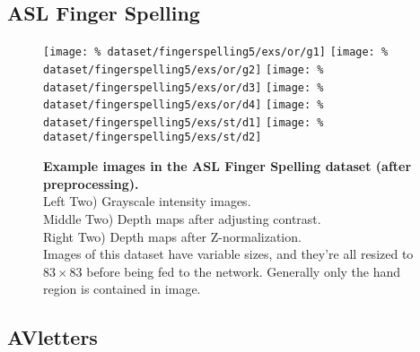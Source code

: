 \subsection{ASL Finger Spelling}

\begin{figure}[H]
  \centering
  \hfill
  \texttt{[image: \%
    dataset/fingerspelling5/exs/or/g1]}
  \hfill
  \texttt{[image: \%
    dataset/fingerspelling5/exs/or/g2]}
  \hfill
  \texttt{[image: \%
    dataset/fingerspelling5/exs/or/d3]}
  \hfill
  \texttt{[image: \%
    dataset/fingerspelling5/exs/or/d4]}
  \hfill
  \texttt{[image: \%
    dataset/fingerspelling5/exs/st/d1]}
  \hfill
  \texttt{[image: \%
    dataset/fingerspelling5/exs/st/d2]}
  \caption{%
    \textbf{Example images in the ASL Finger Spelling dataset
      (after preprocessing).}\\[0.1em]
    Left Two) Grayscale intensity images.\\[0.1em]
    Middle Two) Depth maps after adjusting contrast.\\[0.1em]
    Right Two) Depth maps after Z-normalization.\\[0.1em]
    Images of this dataset have variable sizes, and they're all resized to
      $83 \times 83$ before being fed to the network. Generally only the
      hand region is contained in image.}
  \label{fig:fingerspelling_exs}
\end{figure}

\subsection{AVletters}

